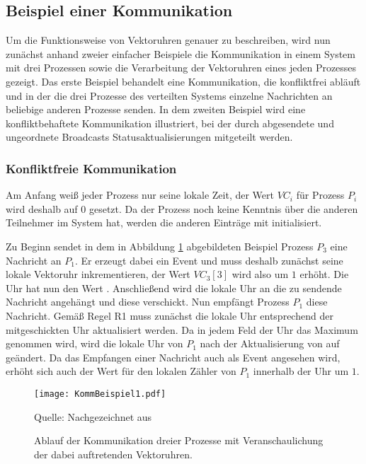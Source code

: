 \subsection{Beispiel einer Kommunikation}

Um die Funktionsweise von Vektoruhren genauer zu beschreiben, wird nun zunächst anhand zweier einfacher Beispiele die Kommunikation in einem System mit drei Prozessen sowie die Verarbeitung der Vektoruhren eines jeden Prozesses gezeigt. Das erste Beispiel behandelt eine Kommunikation, die konfliktfrei abläuft und in der die drei Prozesse des verteilten Systems einzelne Nachrichten an beliebige anderen Prozesse senden. In dem zweiten Beispiel wird eine konfliktbehaftete Kommunikation illustriert, bei der durch abgesendete und ungeordnete Broadcasts Statusaktualisierungen mitgeteilt werden.

\subsubsection{Konfliktfreie Kommunikation}
Am Anfang weiß jeder Prozess nur seine lokale Zeit, der Wert $VC_i$ für Prozess $P_i$ wird deshalb auf $0$ gesetzt. Da der Prozess noch keine Kenntnis über die anderen Teilnehmer im System hat, werden die anderen Einträge mit \qq{$-$} initialisiert.

Zu Beginn sendet in dem in Abbildung \ref{figure:kommBeispiel1} abgebildeten Beispiel Prozess $P_3$ eine Nachricht an $P_1$. Er erzeugt dabei ein Event und muss deshalb zunächst seine lokale Vektoruhr inkrementieren, der Wert $VC_3[3]$ wird also um $1$ erhöht. Die Uhr hat nun den Wert . Anschließend wird die lokale Uhr an die zu sendende Nachricht angehängt und diese verschickt.
Nun empfängt Prozess $P_1$ diese Nachricht. Gemäß Regel R1 muss zunächst die lokale Uhr entsprechend der mitgeschickten Uhr aktualisiert werden. Da in jedem Feld der Uhr das Maximum genommen wird, wird die lokale Uhr von $P_1$ nach der Aktualisierung von  auf  geändert. Da das Empfangen einer Nachricht auch als Event angesehen wird, erhöht sich auch der Wert für den lokalen Zähler von $P_1$ innerhalb der Uhr um $1$.

\begin{figure}[ht]
	\centering
	\texttt{[image: KommBeispiel1.pdf]}
	\caption[Beispiel einer konfliktfreien Kommunikation]{Ablauf der Kommunikation dreier Prozesse mit Veranschaulichung der dabei auftretenden Vektoruhren.}
	Quelle: Nachgezeichnet aus \cite{Baldoni:2002:FDC:1435723.1437765}
	\label{figure:kommBeispiel1}
\end{figure}
\FloatBarrier

